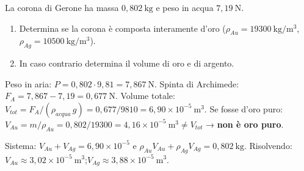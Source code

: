 
\begin{question}[ID=6.2, subtitle={Corona di Gerone: oro o argento?}, tags={fluidi, Archimede, densità}, difficulty=difficile]
La corona di Gerone ha massa $0{,}802\ \mathrm{kg}$ e peso in acqua $7{,}19\ \mathrm{N}$.
\begin{enumerate}
    \item Determina se la corona è composta interamente d'oro ($\rho_{Au} = 19300\ \mathrm{kg/m^3}$, $\rho_{Ag} = 10500\ \mathrm{kg/m^3}$).
    \item In caso contrario determina il volume di oro e di argento.
\end{enumerate}
\begin{solution}
Peso in aria: $P = 0{,}802\cdot9{,}81 = 7{,}867\ \mathrm{N}$. Spinta di Archimede: $F_A = 7{,}867 - 7{,}19 = 0{,}677\ \mathrm{N}$.
Volume totale: $V_{tot} = F_A/(\rho_{acqua}\,g) = 0{,}677/9810 = 6{,}90\times10^{-5}\ \mathrm{m^3}$.
Se fosse d'oro puro: $V_{Au} = m/\rho_{Au} = 0{,}802/19300 = 4{,}16\times10^{-5}\ \mathrm{m^3} \neq V_{tot}$ → \textbf{non è oro puro}.

Sistema: $V_{Au} + V_{Ag} = 6{,}90\times10^{-5}$ e $\rho_{Au}V_{Au} + \rho_{Ag}V_{Ag} = 0{,}802\ \mathrm{kg}$.
Risolvendo: $V_{Au} \approx 3{,}02\times10^{-5}\ \mathrm{m^3}$;\quad $V_{Ag} \approx 3{,}88\times10^{-5}\ \mathrm{m^3}$.
\end{solution}
\end{question}


